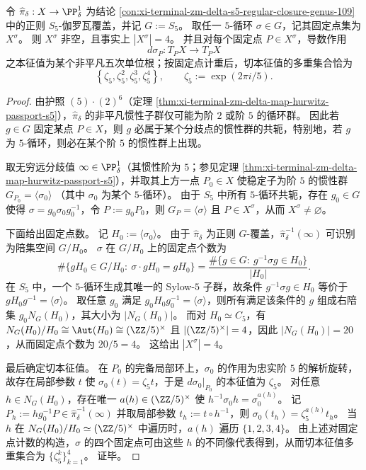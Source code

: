 
\begin{theorem}\label{thm:xi-terminal-zm-delta-s5-5cycle-tangent-spectrum}
令 \(\widehat\pi_\delta:X\to\PP^1_\delta\) 为结论 \ref{con:xi-terminal-zm-delta-s5-regular-closure-genus-109} 中的正则 \(S_5\)-伽罗瓦覆盖，并记 \(G:=S_5\)。
取任一 \(5\)-循环 \(\sigma\in G\)，记其固定点集为 \(X^\sigma\)。
则 \(X^\sigma\) 非空，且事实上 \(|X^\sigma|=4\)。
并且对每个固定点 \(P\in X^\sigma\)，导数作用
\[
d\sigma_P:T_PX\to T_PX
\]
之本征值为某个非平凡五次单位根；按固定点计重后，切本征值的多重集合恰为
\[
\left\{\zeta_5,\zeta_5^{2},\zeta_5^{3},\zeta_5^{4}\right\},
\qquad \zeta_5:=\exp(2\pi i/5).
\]
\end{theorem}
\begin{proof}
由护照 \((5)\cdot(2)^6\)（定理 \ref{thm:xi-terminal-zm-delta-map-hurwitz-passport-s5}），\(\widehat\pi_\delta\) 的非平凡惯性子群仅可能为阶 \(2\) 或阶 \(5\) 的循环群。
因此若 \(g\in G\) 固定某点 \(P\in X\)，则 \(g\) 必属于某个分歧点的惯性群的共轭，特别地，若 \(g\) 为 \(5\)-循环，则必在某个阶 \(5\) 的惯性群上出现。
\par
取无穷远分歧值 \(\infty\in\PP^1_\delta\)（其惯性阶为 \(5\)；参见定理 \ref{thm:xi-terminal-zm-delta-map-hurwitz-passport-s5}），并取其上方一点 \(P_0\in X\) 使稳定子为阶 \(5\) 的惯性群
\(
G_{P_0}=\langle\sigma_0\rangle
\)
（其中 \(\sigma_0\) 为某个 \(5\)-循环）。
由于 \(S_5\) 中所有 \(5\)-循环共轭，存在 \(g_0\in G\) 使得 \(\sigma=g_0\sigma_0g_0^{-1}\)，令 \(P:=g_0P_0\)，则 \(G_P=\langle\sigma\rangle\) 且 \(P\in X^\sigma\)，从而 \(X^\sigma\neq\varnothing\)。
\par
下面给出固定点数。
记 \(H_0:=\langle\sigma_0\rangle\)。
由于 \(\widehat\pi_\delta\) 为正则 \(G\)-覆盖，\(\widehat\pi_\delta^{-1}(\infty)\) 可识别为陪集空间 \(G/H_0\)。
\(\sigma\) 在 \(G/H_0\) 上的固定点个数为
\[
\#\{gH_0\in G/H_0:\ \sigma\cdot gH_0=gH_0\}
=\frac{\#\{g\in G:\ g^{-1}\sigma g\in H_0\}}{|H_0|}.
\]
在 \(S_5\) 中，一个 \(5\)-循环生成其唯一的 Sylow-\(5\) 子群，故条件 \(g^{-1}\sigma g\in H_0\) 等价于 \(gH_0g^{-1}=\langle\sigma\rangle\)。
取任意 \(g_0\) 满足 \(g_0H_0g_0^{-1}=\langle\sigma\rangle\)，则所有满足该条件的 \(g\) 组成右陪集 \(g_0N_G(H_0)\)，其大小为 \(|N_G(H_0)|\)。
而对 \(H_0\simeq C_5\)，有
\(
N_G(H_0)/H_0\cong \Aut(H_0)\cong(\ZZ/5)^\times
\)
且 \(|(\ZZ/5)^\times|=4\)，因此 \(|N_G(H_0)|=20\)，从而固定点个数为 \(20/5=4\)。
这给出 \(|X^\sigma|=4\)。
\par
最后确定切本征值。
在 \(P_0\) 的完备局部环上，\(\sigma_0\) 的作用为忠实阶 \(5\) 的解析旋转，故存在局部参数 \(t\) 使 \(\sigma_0(t)=\zeta_5 t\)，于是 \(d\sigma_0|_{P_0}\) 的本征值为 \(\zeta_5\)。
对任意 \(h\in N_G(H_0)\)，存在唯一 \(a(h)\in(\ZZ/5)^\times\) 使 \(h^{-1}\sigma_0h=\sigma_0^{a(h)}\)。
记 \(P_h:=hg_0^{-1}P\in \widehat\pi_\delta^{-1}(\infty)\) 并取局部参数 \(t_h:=t\circ h^{-1}\)，则
\(
\sigma_0(t_h)=\zeta_5^{a(h)}t_h
\)。
当 \(h\) 在 \(N_G(H_0)/H_0\simeq(\ZZ/5)^\times\) 中遍历时，\(a(h)\) 遍历 \(\{1,2,3,4\}\)。
由上述对固定点计数的构造，\(\sigma\) 的四个固定点可由这些 \(h\) 的不同像代表得到，从而切本征值多重集合为 \(\{\zeta_5^k\}_{k=1}^4\)。
证毕。
\end{proof}

